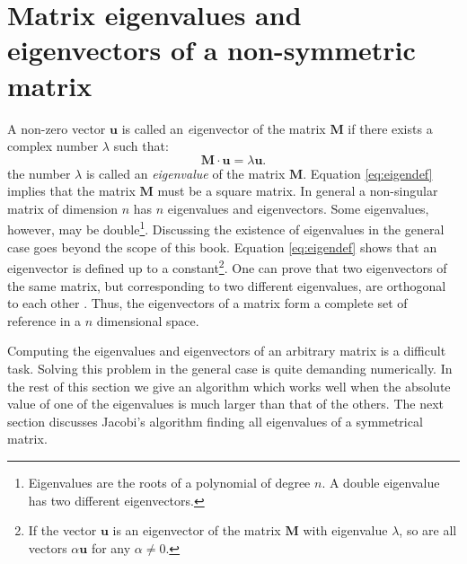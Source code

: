 \section{Matrix eigenvalues and eigenvectors of a non-symmetric matrix}
\label{sec:eigen} A non-zero vector $\textbf{u}$ is called an {\textsl eigenvector} of the matrix $\textbf{M}$ if there exists a complex number $\lambda$ such that:
\begin{equation}
\label{eq:eigendef}
 \textbf{M}\cdot\textbf{u}=\lambda\textbf{u}.
\end{equation}
the number $\lambda$ is called an \textsl{eigenvalue} of the matrix
$\textbf{M}$. Equation \ref{eq:eigendef} implies that the matrix
$\textbf{M}$ must be a square matrix. In general a non-singular
matrix of dimension $n$ has $n$ eigenvalues and eigenvectors. Some
eigenvalues, however, may be double\footnote{Eigenvalues are the
roots of a polynomial of degree $n$. A double eigenvalue has two
different eigenvectors.}. Discussing the existence of eigenvalues
in the general case goes beyond the scope of this book. Equation
\ref{eq:eigendef} shows that an eigenvector is defined up to a
constant\footnote{If the vector $\textbf{u}$ is an eigenvector of the
matrix $\textbf{M}$ with eigenvalue $\lambda$, so are all vectors
$\alpha\textbf{u}$ for any $\alpha\ne 0$.}. One can prove that two
eigenvectors of the same matrix, but corresponding to two
different eigenvalues, are orthogonal to each other \cite{Bass}.
Thus, the eigenvectors of a matrix form a complete set of
reference in a $n$ dimensional space.

Computing the eigenvalues and eigenvectors of an arbitrary matrix
is a difficult task. Solving this problem in the general case is
quite demanding numerically. In the rest of this section we give
an algorithm which works well when the absolute value of one of
the eigenvalues is much larger than that of the others. The next
section discusses Jacobi's algorithm finding all eigenvalues of a
symmetrical matrix.

